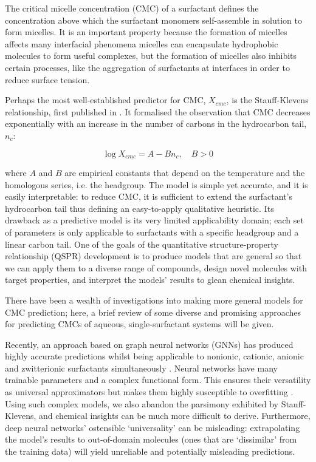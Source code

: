 The critical micelle concentration (CMC) of a surfactant defines the concentration above which the surfactant monomers self-assemble in solution to form micelles. It is an important property because the formation of micelles affects many interfacial phenomena \cite{rosenSurfactantsInterfacialPhenomena2012} micelles can encapsulate hydrophobic molecules to form useful complexes, but the formation of micelles also inhibits certain processes, like the aggregation of surfactants at interfaces in order to reduce surface tension.

Perhaps the most well-established predictor for CMC, $X_{cmc}$, is the Stauff-Klevens relationship, first published in \citeyear{klevensStructureAggregationDilate1953} \cite{klevensStructureAggregationDilate1953}. It formalised the observation that CMC decreases exponentially with an increase in the number of carbons in the hydrocarbon tail, $n_c$:

\begin{equation}
    \label{eq:klevens}
    \log X_{cmc} = A - Bn_c, \quad B > 0
\end{equation}

where $A$ and $B$ are empirical constants that depend on the temperature and the homologous series, i.e. the headgroup. The model is simple yet accurate, and it is easily interpretable: to reduce CMC, it is sufficient to extend the surfactant's hydrocarbon tail thus defining an easy-to-apply qualitative heuristic. Its drawback as a predictive model is its very limited applicability domain; each set of parameters is only applicable to surfactants with a specific headgroup and a linear carbon tail.
One of the goals of the quantitative structure-property relationship (QSPR) development is to produce models that are general so that we can apply them to a diverse range of compounds, design novel molecules with target properties, and
interpret the models' results to glean chemical insights.

There have been a wealth of investigations into making more general models for
CMC prediction; here, a brief review of some diverse and promising approaches
for predicting CMCs of aqueous, single-surfactant systems will be given.



Recently, an approach based on graph neural networks (GNNs) has produced highly accurate predictions whilst being applicable to nonionic, cationic, anionic and zwitterionic surfactants simultaneously
\cite{qinPredictingCriticalMicelle2021}. Neural networks have many trainable parameters and a complex functional form. This ensures their versatility as universal approximators but makes them highly susceptible to overfitting \cite{bejaniSystematicReviewOverfitting2021}. Using such complex models, we also abandon the parsimony exhibited by Stauff-Klevens, and chemical insights can be much more difficult to derive. Furthermore, deep neural networks' ostensible `universality' can be misleading: extrapolating the model's results to out-of-domain molecules (ones that are `dissimilar' from the training data) will yield unreliable and potentially misleading predictions.

